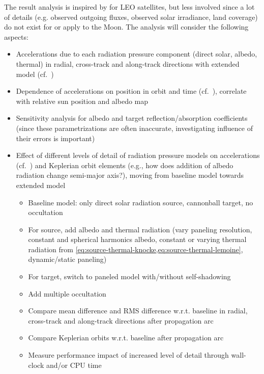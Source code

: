 \documentclass[parskip=full,DIV=15]{scrartcl}
\begin{document}
The result analysis is inspired by \textcite{Vielberg2020} for LEO satellites, but less involved since a lot of details (e.g. observed outgoing fluxes, observed solar irradiance, land coverage) do not exist for or apply to the Moon. The analysis will consider the following aspects:
\begin{itemize}
   \item Accelerations due to each radiation pressure component (direct solar, albedo, thermal) in radial, cross-track and along-track directions with extended model (cf.~\cite[Fig.~3]{Vielberg2020})
   \item Dependence of accelerations on position in orbit and time (cf.~\cite[Fig.~7]{Vielberg2020}), correlate with relative sun position and albedo map
   \item Sensitivity analysis for albedo and target reflection/absorption coefficients (since these parametrizations are often inaccurate, investigating influence of their errors is important)
   \item Effect of different levels of detail of radiation pressure models on accelerations (cf.~\cite[Fig.~8]{Vielberg2020}) and Keplerian orbit elements (e.g., how does addition of albedo radiation change semi-major axis?), moving from baseline model towards extended model
   \begin{itemize}
      \item Baseline model: only direct solar radiation source, cannonball target, no occultation
      \item For source, add albedo and thermal radiation (vary paneling resolution, constant and spherical harmonics albedo, constant or varying thermal radiation from \cref{eq:source-thermal-knocke,eq:source-thermal-lemoine}, dynamic/static paneling)
      \item For target, switch to paneled model with/without self-shadowing
      \item Add multiple occultation
      \item Compare mean difference and RMS difference w.r.t. baseline in radial, cross-track and along-track directions after propagation arc
      \item Compare Keplerian orbits w.r.t. baseline after propagation arc
      \item Measure performance impact of increased level of detail through wall-clock and/or CPU time
   \end{itemize}
\end{itemize}
\end{document}
